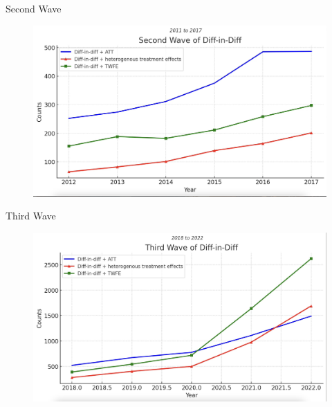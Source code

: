 \documentclass{beamer}
\begin{document}
\begin{frame}{Second Wave}

	\begin{figure}
	\includegraphics[scale=0.15]{./lecture_includes/wave2}
	\end{figure}

\end{frame}

\begin{frame}{Third Wave}

	\begin{figure}
	\includegraphics[scale=0.15]{./lecture_includes/wave3}
	\end{figure}

\end{frame}
\end{document}
